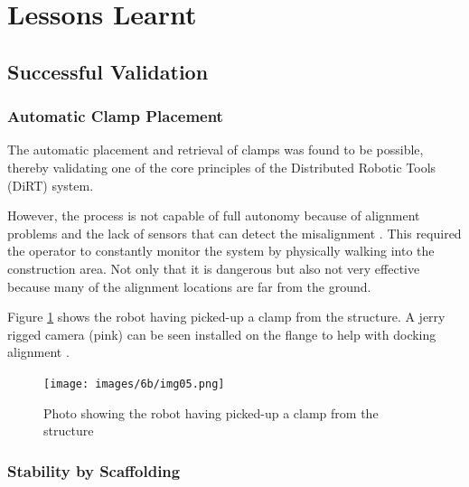 \FloatBarrier

\section{Lessons Learnt}
\label{section:exploration-3-lessons-learnt}

\subsection{Successful Validation}
\label{subsection:exploration-3-successful-validation}

\subsubsection{Automatic Clamp Placement}
\label{subsubsection:exploration-3-automatic-clamp-placement}

The automatic placement and retrieval of clamps was found to be possible, thereby validating one of the core principles of the Distributed Robotic Tools (DiRT) system.

However, the process is not capable of full autonomy because of alignment problems and the lack of sensors that can detect the misalignment . This required the operator to constantly monitor the system by physically walking into the construction area. Not only that it is dangerous but also not very effective because many of the alignment locations are far from the ground.

Figure \ref{fig:robot-picking-up-clamp} shows the robot having picked-up a clamp from the structure. A jerry rigged camera (pink) can be seen installed on the flange to help with docking alignment .

\begin{figure}[!h]
    \centering
    \texttt{[image: images/6b/img05.png]}
    \caption{Photo showing the robot having picked-up a clamp from the structure}
    \label{fig:robot-picking-up-clamp}
\end{figure}


\subsubsection{Stability by Scaffolding}
\label{subsubsection:exploration-3-stability-by-scaffolding}

